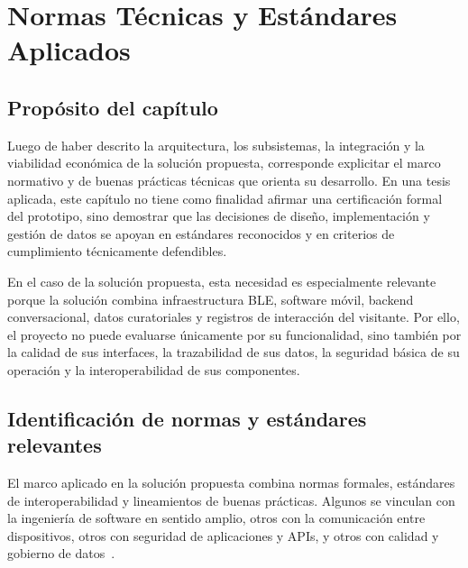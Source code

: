 \chapter{Normas Técnicas y Estándares Aplicados}

\section{Propósito del capítulo}

Luego de haber descrito la arquitectura, los subsistemas, la integración y la viabilidad económica de la solución propuesta, corresponde explicitar el marco normativo y de buenas prácticas técnicas que orienta su desarrollo. En una tesis aplicada, este capítulo no tiene como finalidad afirmar una certificación formal del prototipo, sino demostrar que las decisiones de diseño, implementación y gestión de datos se apoyan en estándares reconocidos y en criterios de cumplimiento técnicamente defendibles.

En el caso de la solución propuesta, esta necesidad es especialmente relevante porque la solución combina infraestructura BLE, software móvil, backend conversacional, datos curatoriales y registros de interacción del visitante. Por ello, el proyecto no puede evaluarse únicamente por su funcionalidad, sino también por la calidad de sus interfaces, la trazabilidad de sus datos, la seguridad básica de su operación y la interoperabilidad de sus componentes.

\section{Identificación de normas y estándares relevantes}

El marco aplicado en la solución propuesta combina normas formales, estándares de interoperabilidad y lineamientos de buenas prácticas. Algunos se vinculan con la ingeniería de software en sentido amplio, otros con la comunicación entre dispositivos, otros con seguridad de aplicaciones y APIs, y otros con calidad y gobierno de datos~\cite{iso12207,bluetoothcore62,rfc8259,owaspapi2023,owaspllm,iso25012,ley29733,cidoccrm,lido,dublincore}.

